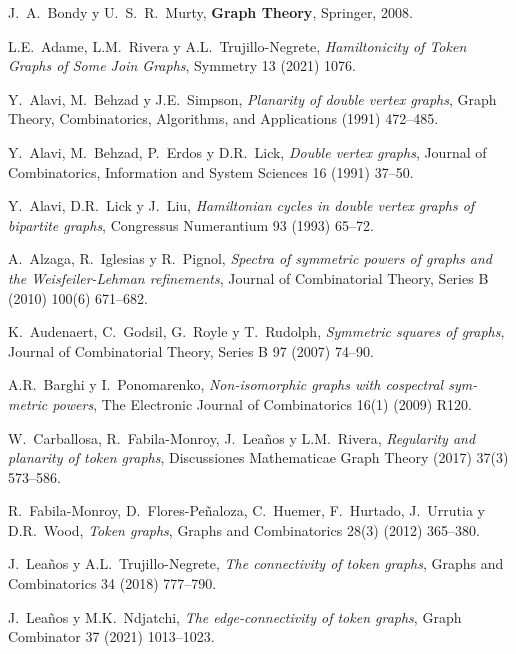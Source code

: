 \begin{thebibliography}{99}

  J.~A.~Bondy y U.~S.~R.~Murty,
  \textbf{Graph Theory},
  Springer, 2008.

  L.E.~Adame, L.M.~Rivera y A.L.~Trujillo-Negrete,
  \textit{Hamiltonicity of Token Graphs of Some Join Graphs},
  Symmetry 13 (2021) 1076. 

  Y.~Alavi, M.~Behzad y J.E.~Simpson,
  \textit{Planarity of double vertex graphs},
  Graph Theory, Combinatorics, Algorithms, and Applications (1991) 472--485.

 Y.~Alavi, M.~Behzad, P.~Erdos y D.R.~Lick,
 \textit{Double vertex graphs},
 Journal of Combinatorics, Information and System Sciences 16 (1991) 37--50.

 Y.~Alavi, D.R.~Lick y J.~Liu,
 \textit{Hamiltonian cycles in double vertex graphs of bipartite graphs},
 Congressus Numerantium 93 (1993) 65--72.

  A.~Alzaga, R.~Iglesias y  R.~Pignol,
  \textit{Spectra of symmetric powers of graphs and
  the Weisfeiler-Lehman refinements},
  Journal of Combinatorial Theory, Series B (2010) 100(6) 671--682. 

  K.~Audenaert, C.~Godsil, G.~Royle y T.~Rudolph,
  \textit{Symmetric squares of graphs},
  Journal of Combinatorial Theory, Series B 97 (2007) 74--90. 

  A.R.~Barghi y I.~Ponomarenko,
  \textit{Non-isomorphic graphs with cospectral sym-
  metric powers},
  The Electronic Journal of Combinatorics 16(1) (2009) R120.

  W.~Carballosa, R.~Fabila-Monroy, J.~Lea\~{n}os y L.M.~Rivera,
  \textit{Regularity and
  planarity of token graphs},
  Discussiones Mathematicae Graph Theory (2017) 37(3) 573--586. 

  R.~Fabila-Monroy, D.~Flores-Pe\~{n}aloza, C.~Huemer, F.~Hurtado, J.~Urrutia y
D.R.~Wood,
  \textit{Token graphs},
  Graphs and Combinatorics 28(3) (2012) 365--380. 

  J.~Lea\~{n}os y A.L.~Trujillo-Negrete,
  \textit{The connectivity of token graphs},
  Graphs and Combinatorics 34 (2018) 777--790. 

  J.~Lea\~{n}os y M.K.~Ndjatchi,
  \textit{The edge-connectivity of token graphs},
  Graph Combinator 37 (2021) 1013--1023. 
 

\end{thebibliography}
